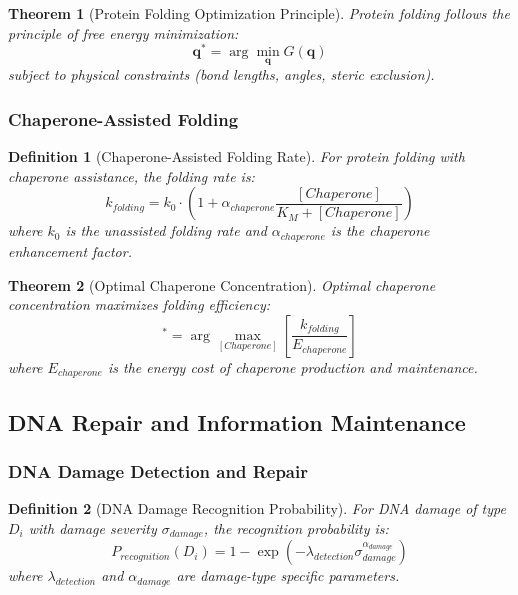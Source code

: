 \documentclass[12pt,a4paper]{article}
\newtheorem{theorem}{Theorem}
\newtheorem{definition}{Definition}
\begin{document}
\begin{theorem}[Protein Folding Optimization Principle]
Protein folding follows the principle of free energy minimization:
\begin{equation}
\mathbf{q}^* = \arg\min_{\mathbf{q}} G(\mathbf{q})
\end{equation}
subject to physical constraints (bond lengths, angles, steric exclusion).
\end{theorem}

\subsubsection{Chaperone-Assisted Folding}

\begin{definition}[Chaperone-Assisted Folding Rate]
For protein folding with chaperone assistance, the folding rate is:
\begin{equation}
k_{folding} = k_0 \cdot \left(1 + \alpha_{chaperone} \frac{[Chaperone]}{K_M + [Chaperone]}\right)
\end{equation}
where $k_0$ is the unassisted folding rate and $\alpha_{chaperone}$ is the chaperone enhancement factor.
\end{definition}

\begin{theorem}[Optimal Chaperone Concentration]
Optimal chaperone concentration maximizes folding efficiency:
\begin{equation}
[Chaperone]^* = \arg\max_{[Chaperone]} \left[ \frac{k_{folding}}{E_{chaperone}} \right]
\end{equation}
where $E_{chaperone}$ is the energy cost of chaperone production and maintenance.
\end{theorem}

\subsection{DNA Repair and Information Maintenance}

\subsubsection{DNA Damage Detection and Repair}

\begin{definition}[DNA Damage Recognition Probability]
For DNA damage of type $D_i$ with damage severity $\sigma_{damage}$, the recognition probability is:
\begin{equation}
P_{recognition}(D_i) = 1 - \exp\left(-\lambda_{detection} \sigma_{damage}^{\alpha_{damage}}\right)
\end{equation}
where $\lambda_{detection}$ and $\alpha_{damage}$ are damage-type specific parameters.
\end{definition}
\end{document}
